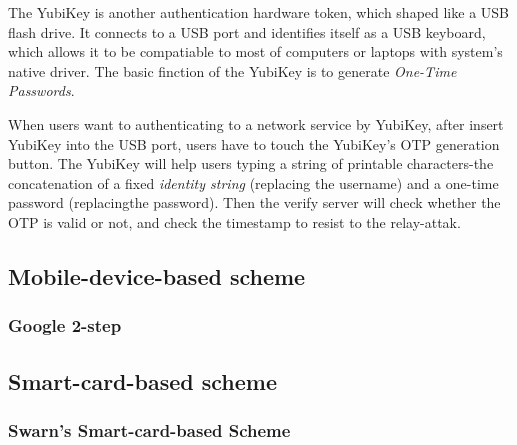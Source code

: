 \begin{CJK}{Bg5}{bsmi}
The YubiKey is another authentication hardware token, which shaped like a USB flash drive. It connects to a USB port and identifies itself as a USB keyboard, which allows it to be compatiable to most of computers or laptops with system's native driver. The basic finction of the YubiKey is to generate \emph{One-Time Passwords}. 

When users want to authenticating to a network service by YubiKey, after insert YubiKey into the USB port, users have to touch the YubiKey's OTP generation button. The YubiKey will help users typing a string of printable characters-the concatenation of a fixed \emph{identity string} (replacing the username) and a one-time password (replacingthe password). Then the verify server will check whether the OTP is valid or not, and check the timestamp to resist to the relay-attak.

\subsection{Mobile-device-based scheme}

\subsubsection{Google 2-step}

\subsection{Smart-card-based scheme}

\subsubsection{Swarn's Smart-card-based Scheme}

\end{CJK}